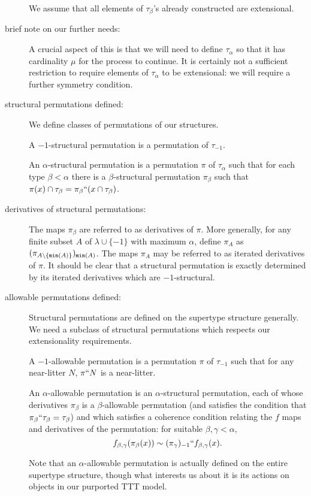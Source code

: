 \documentclass[112pt]{article}
\begin{document}
\begin{description}
We assume that all elements of $\tau_\beta$'s already constructed are extensional.

\item[brief note on our further needs:]  A crucial aspect of this is that we will need to define $\tau_\alpha$ so that it has cardinality $\mu$ for the process to continue.  It is certainly not a sufficient restriction to require elements of $\tau_\alpha$ to be extensional:  we will require a further symmetry condition.

\item[structural permutations defined:]  We define classes of permutations of our structures.

A $-1$-structural permutation is a permutation of $\tau_{-1}$.

An $\alpha$-structural permutation is a permutation $\pi$ of $\tau_\alpha$ such that for each type $\beta<\alpha$ there is a $\beta$-structural permutation
$\pi_\beta$ such that $\pi(x) \cap \tau_\beta = \pi_\beta``(x \cap \tau_\beta)$.

\item[derivatives of structural permutations:]  The maps $\pi_\beta$ are referred to as derivatives of $\pi$.  More generally, for any finite subset $A$ of $\lambda \cup \{-1\}$ with maximum $\alpha$,
define $\pi_A$ as $(\pi_{A \setminus \{{\tt min}(A)\}})_{{\tt min}(A)}$.  The maps $\pi_A$ may be referred to as iterated derivatives of $\pi$.  It should be clear that a structural permutation is exactly determined by its iterated derivatives which are $-1$-structural.

\item[allowable permutations defined:]  Structural permutations are defined on the supertype structure generally.  We need a subclass of structural permutations which respects our extensionality requirements.

A $-1$-allowable permutation is a permutation $\pi$ of $\tau_{-1}$ such that for any near-litter $N$, $\pi``N$ is a near-litter.

An $\alpha$-allowable permutation is an $\alpha$-structural permutation, each of whose derivatives $\pi_\beta$ is a $\beta$-allowable permutation (and satisfies the condition that $\pi_\beta``\tau_\beta = \tau_\beta$) and which satisfies a coherence condition relating the $f$ maps and derivatives of the permutation:  for suitable $\beta,\gamma<\alpha$, $$f_{\beta,\gamma}(\pi_\beta(x)) \sim (\pi_\gamma)_{-1}``f_{\beta,\gamma}(x).$$

Note that an $\alpha$-allowable permutation is actually defined on the entire supertype structure, though what interests us about it is its actions on objects in our purported TTT model.


\end{description}
\end{document}
